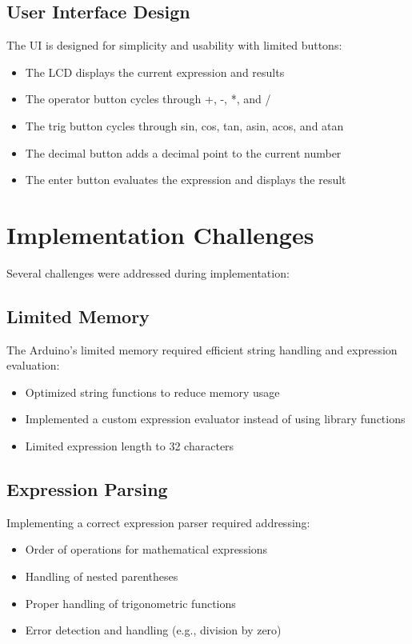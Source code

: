 \documentclass[12pt,a4paper]{article}
\begin{document}
\subsection{User Interface Design}
The UI is designed for simplicity and usability with limited buttons:
\begin{itemize}
    \item The LCD displays the current expression and results
    \item The operator button cycles through +, -, *, and /
    \item The trig button cycles through sin, cos, tan, asin, acos, and atan
    \item The decimal button adds a decimal point to the current number
    \item The enter button evaluates the expression and displays the result
\end{itemize}

\section{Implementation Challenges}
Several challenges were addressed during implementation:
\subsection{Limited Memory}
The Arduino's limited memory required efficient string handling and expression evaluation:
\begin{itemize}
    \item Optimized string functions to reduce memory usage
    \item Implemented a custom expression evaluator instead of using library functions
    \item Limited expression length to 32 characters
\end{itemize}

\subsection{Expression Parsing}
Implementing a correct expression parser required addressing:
\begin{itemize}
    \item Order of operations for mathematical expressions
    \item Handling of nested parentheses
    \item Proper handling of trigonometric functions
    \item Error detection and handling (e.g., division by zero)
\end{itemize}
\end{document}
